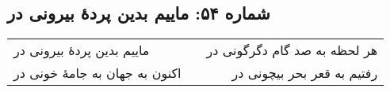\begin{center}
\section*{شماره ۵۴: ماییم بدین پردۀ بیرونی در}
\label{sec:054}
\begin{longtable}{l p{0.5cm} r}
ماییم بدین پردهٔ بیرونی در
&&
هر لحظه به صد گام دگرگونی در
\\
اکنون به جهان به جامهٔ خونی در
&&
رفتیم به قعر بحر بیچونی در
\\
\end{longtable}
\end{center}

